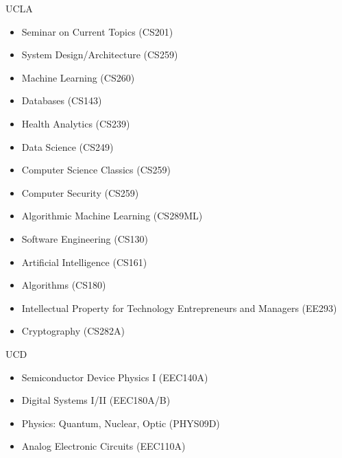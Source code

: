 
\begin{cvskills}

  \cvskill
    {UCLA} %
    {
      \begin{multicols}{3}
        \begin{itemize}
          \item Seminar on Current Topics (CS201)
          \item System Design/Architecture (CS259)
          \item Machine Learning (CS260)
          \item Databases (CS143)
          \item Health Analytics (CS239)
          \item Data Science (CS249)
          \item Computer Science Classics (CS259)
          \item Computer Security (CS259)
          \item Algorithmic Machine Learning (CS289ML)
          \item Software Engineering (CS130)
          \item Artificial Intelligence (CS161)
          \item Algorithms (CS180)
          \item Intellectual Property for Technology Entrepreneurs and Managers (EE293)
          \item Cryptography (CS282A)
        \end{itemize}
      \end{multicols}
    }
  \cvskill
    {UCD} %
    {
      \begin{multicols}{3}
        \begin{itemize}
          \item Semiconductor Device Physics I (EEC140A)
          \item Digital Systems I/II (EEC180A/B)
          \item Physics: Quantum, Nuclear, Optic (PHYS09D)
          \item Analog Electronic Circuits (EEC110A)

\end{itemize}
\end{multicols}}
\end{cvskills}
